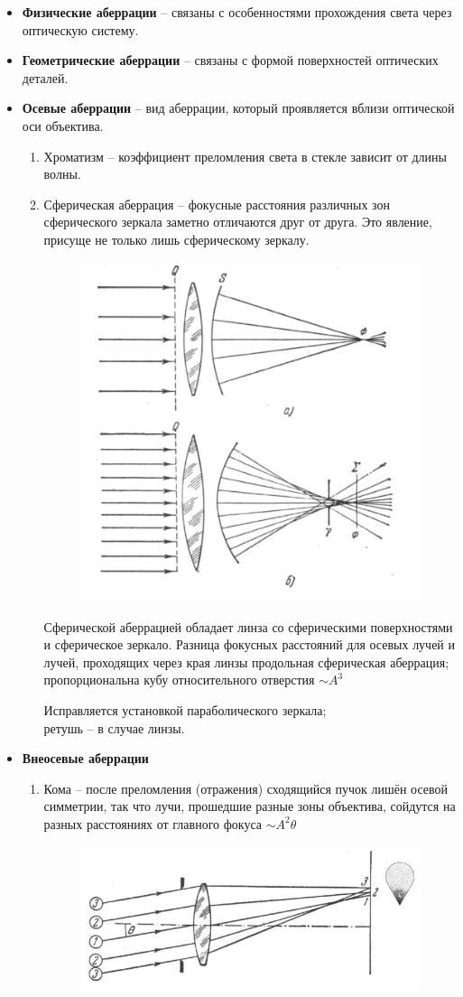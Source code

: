 \documentclass[12pt]{article}
\begin{document}
\begin{itemize}
	\item \textbf{Физические аберрации} -- связаны с особенностями
	прохождения света через оптическую систему.
	\item \textbf{Геометрические аберрации} -- связаны с формой поверхностей оптических деталей.
	\item \textbf{Осевые аберрации} -- вид аберрации, который проявляется вблизи оптической оси объектива.
		\begin{enumerate}
			\item Хроматизм -- коэффициент преломления света в стекле	зависит от длины волны.
			\item Сферическая аберрация -- фокусные расстояния различных зон сферического зеркала
			заметно отличаются друг от друга. Это явление, присуще не
			только лишь сферическому зеркалу.
			\begin{figure}[h]
				\centering
				\includegraphics[width=0.5\linewidth]{"Снимок экрана от 2024-12-22 18-26-53"}
			\end{figure}
			
			Сферической аберрацией обладает линза со сферическими поверхностями
			и сферическое зеркало.
			Разница фокусных расстояний для осевых лучей и
			лучей, проходящих через края линзы
			продольная сферическая аберрация;
			пропорциональна кубу
			относительного отверстия $\sim A^3$
			
			Исправляется установкой параболического зеркала;\\ ретушь -- в случае линзы.
					\end{enumerate}
		\item \textbf{Внеосевые аберрации} 
		\begin{enumerate}
			\item Кома -- после преломления (отражения) сходящийся
			пучок лишён осевой симметрии, так что лучи, прошедшие разные зоны объектива,
			сойдутся на разных расстояниях от главного фокуса $\sim A^2 \theta$\\
			\begin{figure}[h]
				\centering
				\includegraphics[width=0.5\linewidth]{"Снимок экрана от 2024-12-22 18-32-13"}
			\end{figure}\\
			

\end{enumerate}
\end{itemize}
\end{document}
